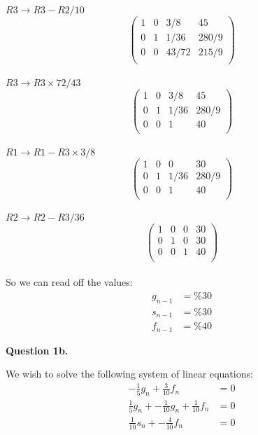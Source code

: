 \documentclass[12pt,a4paper]{report}
\begin{document}
\(R3 \rightarrow R3 - R2 / 10 \)
  \[
 \left(\begin{array}{rrr|r}
 1 & 0 & 3/8 & 45   \\
 0 & 1 & 1/36 & 280/9  \\
 0 & 0 & 43/72 & 215/9  \\
   \end{array} \right)
\] \\
 
\(R3 \rightarrow R3 \times 72/43 \)
  \[
 \left(\begin{array}{rrr|r}
 1 & 0 & 3/8 & 45   \\
 0 & 1 & 1/36 & 280/9  \\
 0 & 0 & 1 & 40   \\
   \end{array} \right)
\] \\
 
\(R1 \rightarrow R1 - R3 \times 3/8 \)
  \[
 \left(\begin{array}{rrr|r}
 1 & 0 & 0 & 30   \\
 0 & 1 & 1/36 & 280/9  \\
 0 & 0 & 1 & 40   \\
   \end{array} \right)
\] \\
 
\(R2 \rightarrow R2 - R3 / 36 \)
  \[
 \left(\begin{array}{rrr|r}
 1 & 0 & 0 & 30   \\
 0 & 1 & 0 & 30   \\
 0 & 0 & 1 & 40   \\
   \end{array} \right)
\] \\

So we can read off the values:
\begin{align*}
 g_{n-1} &= \%30 \\
 s_{n-1} &= \%30 \\
 f_{n-1} &= \%40
\end{align*} 

\newpage
\textbf{Question 1b.}

We wish to solve the following system of linear equations:
\begin{align*}
-\frac{1}{5}g_n + \frac{3}{10}f_n &= 0\\
\frac{1}{5}g_n + -\frac{1}{10}g_n + \frac{1}{10}f_n &= 0 \\
\frac{1}{10}s_n + -\frac{4}{10}f_n &= 0 \\
\end{align*} 
\end{document}

